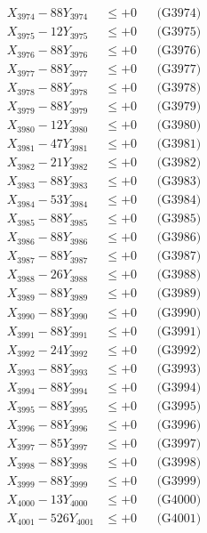\documentclass[a4paper,10pt]{article}
\begin{document}
{\begin{align}
X_{3974} - 88Y_{3974} &\leq +0 && \text{(G3974)} \\
X_{3975} - 12Y_{3975} &\leq +0 && \text{(G3975)} \\
X_{3976} - 88Y_{3976} &\leq +0 && \text{(G3976)} \\
X_{3977} - 88Y_{3977} &\leq +0 && \text{(G3977)} \\
X_{3978} - 88Y_{3978} &\leq +0 && \text{(G3978)} \\
X_{3979} - 88Y_{3979} &\leq +0 && \text{(G3979)} \\
X_{3980} - 12Y_{3980} &\leq +0 && \text{(G3980)} \\
\allowbreak
X_{3981} - 47Y_{3981} &\leq +0 && \text{(G3981)} \\
X_{3982} - 21Y_{3982} &\leq +0 && \text{(G3982)} \\
X_{3983} - 88Y_{3983} &\leq +0 && \text{(G3983)} \\
X_{3984} - 53Y_{3984} &\leq +0 && \text{(G3984)} \\
X_{3985} - 88Y_{3985} &\leq +0 && \text{(G3985)} \\
X_{3986} - 88Y_{3986} &\leq +0 && \text{(G3986)} \\
X_{3987} - 88Y_{3987} &\leq +0 && \text{(G3987)} \\
X_{3988} - 26Y_{3988} &\leq +0 && \text{(G3988)} \\
X_{3989} - 88Y_{3989} &\leq +0 && \text{(G3989)} \\
X_{3990} - 88Y_{3990} &\leq +0 && \text{(G3990)} \\
\allowbreak
X_{3991} - 88Y_{3991} &\leq +0 && \text{(G3991)} \\
X_{3992} - 24Y_{3992} &\leq +0 && \text{(G3992)} \\
X_{3993} - 88Y_{3993} &\leq +0 && \text{(G3993)} \\
X_{3994} - 88Y_{3994} &\leq +0 && \text{(G3994)} \\
X_{3995} - 88Y_{3995} &\leq +0 && \text{(G3995)} \\
X_{3996} - 88Y_{3996} &\leq +0 && \text{(G3996)} \\
X_{3997} - 85Y_{3997} &\leq +0 && \text{(G3997)} \\
X_{3998} - 88Y_{3998} &\leq +0 && \text{(G3998)} \\
X_{3999} - 88Y_{3999} &\leq +0 && \text{(G3999)} \\
X_{4000} - 13Y_{4000} &\leq +0 && \text{(G4000)} \\
\allowbreak
X_{4001} - 526Y_{4001} &\leq +0 && \text{(G4001)} \\

\end{align}}
\end{document}
